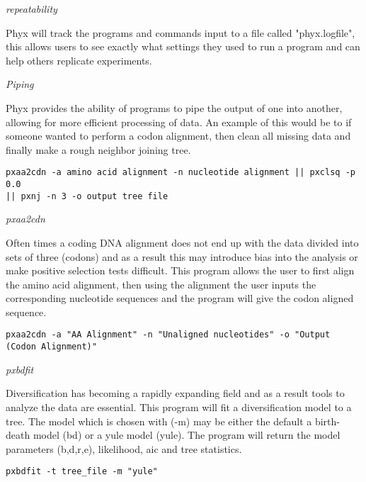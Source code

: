 \documentclass[12pt,letterpaper]{article}
\renewcommand{\subsection}[1]{%
\bigskip
\begin{center}
\begin{large}
\normalfont\itshape #1
\end{large}
\end{center}}
\begin{document}
\subsection{repeatability}

Phyx will track the programs and commands input to a file called "phyx.logfile", this allows users to see exactly what settings they used to run a program and can help others replicate experiments.

\subsection{Piping}

Phyx provides the ability of programs to pipe the output of one into another, allowing for more efficient processing of data. An example of this would be to if someone wanted to perform a codon alignment, then clean all missing data and finally make a rough neighbor joining tree.
\begin{flushleft}
\begin{verbatim}
pxaa2cdn -a amino acid alignment -n nucleotide alignment || pxclsq -p 0.0 
|| pxnj -n 3 -o output tree file
\end{verbatim}
\end{flushleft}
\subsection{pxaa2cdn}

Often times a coding DNA alignment does not end up with the data divided into sets of three (codons) and as a result this may introduce bias into the analysis or make positive selection tests difficult. This program allows the user to first align the amino acid alignment, then using the alignment the user inputs the corresponding nucleotide sequences and the program will give the codon aligned sequence.
\begin{flushleft}
\begin{verbatim}
pxaa2cdn -a "AA Alignment" -n "Unaligned nucleotides" -o "Output (Codon Alignment)"
\end{verbatim}
\end{flushleft}

\subsection{pxbdfit}

Diversification has becoming a rapidly expanding field and as a result tools to analyze the data are essential. This program will fit a diversification model to a tree. The model which is chosen with (-m) may be either the default a birth-death model (bd) or a yule model (yule). The program will return the model parameters (b,d,r,e), likelihood, aic and tree statistics.
\begin{flushleft}
\begin{verbatim}
pxbdfit -t tree_file -m "yule"
\end{verbatim}
\end{flushleft}
\end{document}
